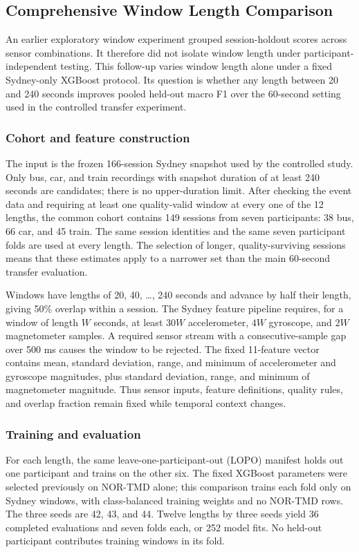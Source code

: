 \subsection{Comprehensive Window Length Comparison}
\label{sec:comprehensive-window-length}

An earlier exploratory window experiment grouped session-holdout scores across sensor
combinations. It therefore did not isolate window length under
participant-independent testing. This follow-up varies window length alone
under a fixed Sydney-only XGBoost protocol. Its question is whether any length
between 20 and 240 seconds improves pooled held-out macro F1 over the
60-second setting used in the controlled transfer experiment.

\subsubsection{Cohort and feature construction}
The input is the frozen 166-session Sydney snapshot used by the controlled
study. Only bus, car, and train recordings with snapshot duration of at least
240 seconds are candidates; there is no upper-duration limit. After checking
the event data and requiring at least one quality-valid window at every one of
the 12 lengths, the common cohort contains 149 sessions from seven participants:
38 bus, 66 car, and 45 train. The same session identities and the same seven
participant folds are used at every length. The selection of longer,
quality-surviving sessions means that these estimates apply to a narrower set
than the main 60-second transfer evaluation.

Windows have lengths of 20, 40, \ldots, 240 seconds and advance by half their
length, giving 50\% overlap within a session. The Sydney feature pipeline
requires, for a window of length $W$ seconds, at least $30W$ accelerometer,
$4W$ gyroscope, and $2W$ magnetometer samples. A required sensor stream with a
consecutive-sample gap over 500 ms causes the window to be rejected. The fixed
11-feature vector contains mean, standard deviation, range, and minimum of
accelerometer and gyroscope magnitudes, plus standard deviation, range, and
minimum of magnetometer magnitude. Thus sensor inputs, feature definitions,
quality rules, and overlap fraction remain fixed while temporal context
changes.

\subsubsection{Training and evaluation}
For each length, the same leave-one-participant-out (LOPO) manifest holds out
one participant and trains on the other six. The fixed XGBoost parameters were
selected previously on NOR-TMD alone; this comparison trains each fold only
on Sydney windows, with class-balanced training weights and no NOR-TMD rows.
The three seeds are 42, 43, and 44. Twelve lengths by three seeds yield 36
completed evaluations and seven folds each, or 252 model fits. No held-out
participant contributes training windows in its fold.

